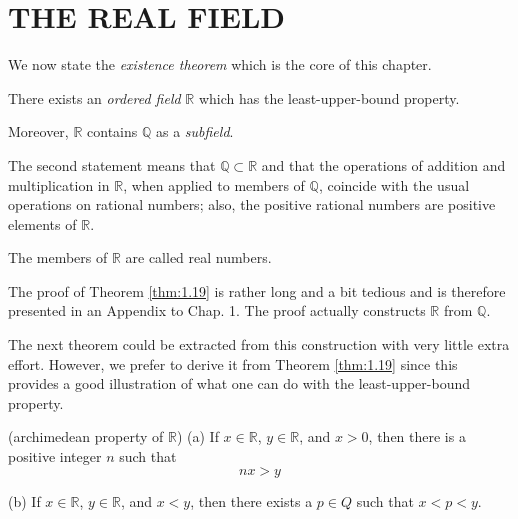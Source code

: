 
\section{THE REAL FIELD}

We now state the \emph{existence theorem} which is the core of this chapter.

\begin{thm}\label{thm:1.19}
There exists an \emph{ordered field} $\mathbb{R}$ which has the least-upper-bound
property.

Moreover, $\mathbb{R}$ contains $\mathbb{Q}$ as a \emph{subfield}.
\end{thm}

The second statement means that $\mathbb{Q} \subset \mathbb{R}$ and that the operations of
addition and multiplication in $\mathbb{R}$, when applied to members of $\mathbb{Q}$, coincide with
the usual operations on rational numbers; also, the positive rational numbers
are positive elements of $\mathbb{R}$.

The members of $\mathbb{R}$ are called real numbers.

The proof of Theorem \ref{thm:1.19} is rather long and a bit tedious and is therefore
presented in an Appendix to Chap. 1. The proof actually constructs $\mathbb{R}$ from $\mathbb{Q}$.

The next theorem could be extracted from this construction with very
little extra effort. However, we prefer to derive it from Theorem \ref{thm:1.19} since this
provides a good illustration of what one can do with the least-upper-bound
property.


\begin{thm}\label{thm:1.20}(archimedean property of $\mathbb{R}$)
    (a) If $x \in \mathbb{R}$, $y \in \mathbb{R}$, and $x > 0$, then there is a positive integer $n$ such that
    \begin{equation*}
        nx > y
    \end{equation*}

    (b) If $x \in \mathbb{R}$, $y \in \mathbb{R}$, and $x < y$, then there exists a $p \in Q$ such that $x < p < y$.
\end{thm}

